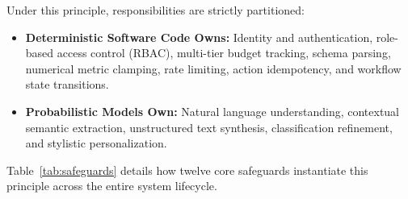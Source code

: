 \documentclass[10pt,a4paper,twocolumn]{article}
\begin{document}
Under this principle, responsibilities are strictly partitioned:
\begin{itemize}[leftmargin=*]
  \item \textbf{Deterministic Software Code Owns:} Identity and authentication, role-based access control (RBAC), multi-tier budget tracking, schema parsing, numerical metric clamping, rate limiting, action idempotency, and workflow state transitions.
  \item \textbf{Probabilistic Models Own:} Natural language understanding, contextual semantic extraction, unstructured text synthesis, classification refinement, and stylistic personalization.
\end{itemize}

Table~\ref{tab:safeguards} details how twelve core safeguards instantiate this principle across the entire system lifecycle.
\end{document}
